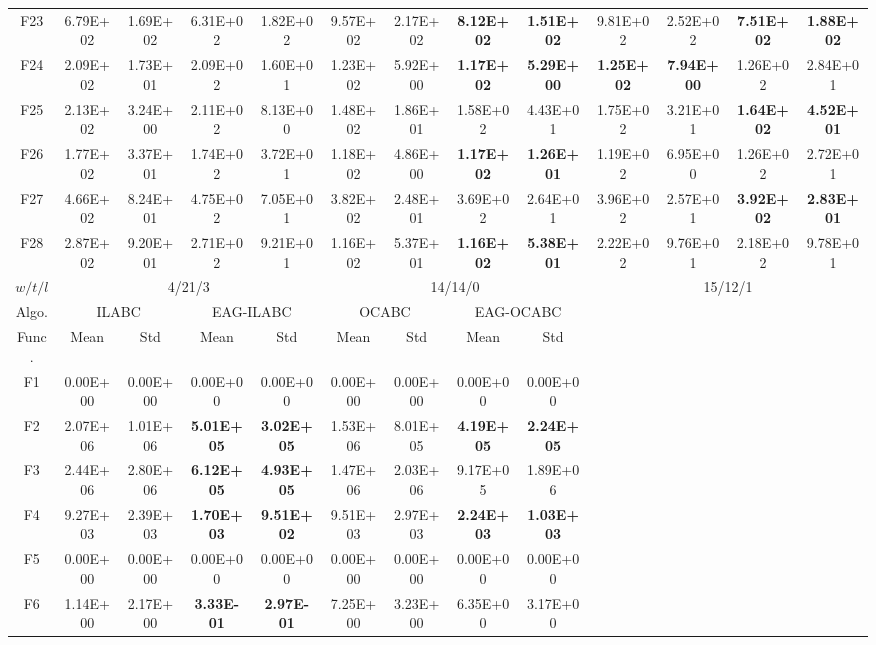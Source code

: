 \begin{table*}[!ht]
\begin{tabular}{|c|cc|cc|cc|cc|cc|cc|}
    F23   & 6.79E+02 & 1.69E+02 & 6.31E+02 & 1.82E+02 & 9.57E+02 & 2.17E+02 & \textbf{8.12E+02} & \textbf{1.51E+02} & 9.81E+02 & 2.52E+02 & \textbf{7.51E+02} & \textbf{1.88E+02} \\
    F24   & 2.09E+02 & 1.73E+01 & 2.09E+02 & 1.60E+01 & 1.23E+02 & 5.92E+00 & \textbf{1.17E+02} & \textbf{5.29E+00} & \textbf{1.25E+02} & \textbf{7.94E+00} & 1.26E+02 & 2.84E+01 \\
    F25   & 2.13E+02 & 3.24E+00 & 2.11E+02 & 8.13E+00 & 1.48E+02 & 1.86E+01 & 1.58E+02 & 4.43E+01 & 1.75E+02 & 3.21E+01 & \textbf{1.64E+02} & \textbf{4.52E+01} \\
    F26   & 1.77E+02 & 3.37E+01 & 1.74E+02 & 3.72E+01 & 1.18E+02 & 4.86E+00 & \textbf{1.17E+02} & \textbf{1.26E+01} & 1.19E+02 & 6.95E+00 & 1.26E+02 & 2.72E+01 \\
    F27   & 4.66E+02 & 8.24E+01 & 4.75E+02 & 7.05E+01 & 3.82E+02 & 2.48E+01 & 3.69E+02 & 2.64E+01 & 3.96E+02 & 2.57E+01 & \textbf{3.92E+02} & \textbf{2.83E+01} \\
    F28   & 2.87E+02 & 9.20E+01 & 2.71E+02 & 9.21E+01 & 1.16E+02 & 5.37E+01 & \textbf{1.16E+02} & \textbf{5.38E+01} & 2.22E+02 & 9.76E+01 & 2.18E+02 & 9.78E+01 \\
    \hline
    $w/t/l$ & \multicolumn{4}{c|}{4/21/3}    & \multicolumn{4}{c|}{14/14/0}   & \multicolumn{4}{c|}{15/12/1} \\
    \hline
    \cline{1-9}
    Algo.   & \multicolumn{2}{c|}{ ILABC } & \multicolumn{2}{c|}{EAG-ILABC} & \multicolumn{2}{c|}{ OCABC } & \multicolumn{2}{c|}{EAG-OCABC}   \\ \cline{1-9}
    Func.   &  Mean  &  Std  & Mean  & Std   &  Mean  &  Std  & Mean  & Std  \\ \cline{1-9}
    F1    & 0.00E+00 & 0.00E+00 & 0.00E+00 & 0.00E+00 & 0.00E+00 & 0.00E+00 & 0.00E+00 & 0.00E+00 \\
    F2    & 2.07E+06 & 1.01E+06 & \textbf{5.01E+05} & \textbf{3.02E+05} & 1.53E+06 & 8.01E+05 & \textbf{4.19E+05} & \textbf{2.24E+05} \\
    F3    & 2.44E+06 & 2.80E+06 & \textbf{6.12E+05} & \textbf{4.93E+05} & 1.47E+06 & 2.03E+06 & 9.17E+05 & 1.89E+06 \\
    F4    & 9.27E+03 & 2.39E+03 & \textbf{1.70E+03} & \textbf{9.51E+02} & 9.51E+03 & 2.97E+03 & \textbf{2.24E+03} & \textbf{1.03E+03} \\
    F5    & 0.00E+00 & 0.00E+00 & 0.00E+00 & 0.00E+00 & 0.00E+00 & 0.00E+00 & 0.00E+00 & 0.00E+00 \\
    \cline{1-9}
    F6    & 1.14E+00 & 2.17E+00 & \textbf{3.33E-01} & \textbf{2.97E-01} & 7.25E+00 & 3.23E+00 & 6.35E+00 & 3.17E+00 \\

\end{tabular}
\end{table*}
